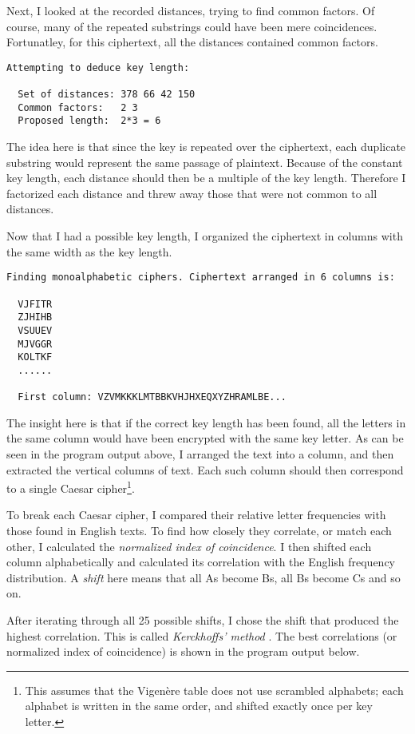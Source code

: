 \documentclass[a4paper,english,12pt]{article}
\begin{document}
Next, I looked at the recorded distances, trying to find common factors. Of
course, many of the repeated substrings could have been mere coincidences.
Fortunatley, for this ciphertext, all the distances contained common factors.

\begin{verbatim}
Attempting to deduce key length:

  Set of distances: 378 66 42 150
  Common factors:   2 3
  Proposed length:  2*3 = 6
\end{verbatim}

The idea here is that since the key is repeated over the ciphertext, each
duplicate substring would represent the same passage of plaintext. Because of
the constant key length, each distance should then be a multiple of the key
length. Therefore I factorized each distance and threw away those that were not
common to all distances.

Now that I had a possible key length, I organized the ciphertext in columns
with the same width as the key length.

\begin{verbatim}
Finding monoalphabetic ciphers. Ciphertext arranged in 6 columns is:

  VJFITR
  ZJHIHB
  VSUUEV
  MJVGGR
  KOLTKF
  ......

  First column: VZVMKKKLMTBBKVHJHXEQXYZHRAMLBE...
\end{verbatim}

The insight here is that if the correct key length has been found, all the
letters in the same column would have been encrypted with the same key letter.
As can be seen in the program output above, I arranged the text into a column,
and then extracted the vertical columns of text. Each such column should then
correspond to a single Caesar cipher\footnote{This assumes that the Vigenère
table does not use scrambled alphabets; each alphabet is written in the same
order, and shifted exactly once per key letter.}.

To break each Caesar cipher, I compared their relative letter frequencies with
those found in English texts. To find how closely they correlate, or match each
other, I calculated the \textit{normalized index of coincidence}. I then
shifted each column alphabetically and calculated its correlation with the
English frequency distribution.
A \textit{shift} here means that all As become Bs, all Bs become Cs and so on.

After iterating through all 25 possible shifts, I chose the shift that produced
the highest correlation. This is called \textit{Kerckhoffs' method}
\cite{wiki:vigenere}. The best correlations (or normalized index of
coincidence) is shown in the program output below.
\end{document}
